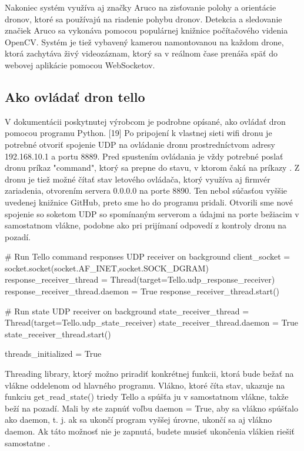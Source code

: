 Nakoniec systém využíva aj značky Aruco na zisťovanie polohy a orientácie dronov, ktoré sa používajú na riadenie pohybu dronov. Detekcia a sledovanie značiek Aruco sa vykonáva pomocou populárnej knižnice počítačového videnia OpenCV. Systém je tiež vybavený kamerou namontovanou na každom drone, ktorá zachytáva živý videozáznam, ktorý sa v reálnom čase prenáša späť do webovej aplikácie pomocou WebSocketov.
\subsection{Ako ovládať dron tello}
V dokumentácii poskytnutej výrobcom je podrobne opísané, ako ovládať dron pomocou programu Python. [19] Po pripojení k vlastnej sieti wifi dronu je potrebné otvoriť spojenie UDP na ovládanie dronu prostredníctvom adresy 192.168.10.1 a portu 8889. Pred spustením ovládania je vždy potrebné poslať dronu príkaz "command", ktorý sa prepne do stavu, v ktorom čaká na príkazy \citep{TelloSDK}. 
Z dronu je tiež možné čítať stav letového ovládača, ktorý využíva aj firmvér zariadenia, otvorením servera 0.0.0.0 na porte 8890. Ten nebol súčasťou vyššie uvedenej knižnice GitHub, preto sme ho do programu pridali. Otvorili sme nové spojenie so soketom UDP so spomínaným serverom a údajmi na porte bežiacim v samostatnom vlákne, podobne ako pri prijímaní odpovedí z kontroly dronu na pozadí. 

\begin{mypython}[caption={ukazuje obsluhu vlákna obsiahnutú v jazyku Python },label=SO-test]
    # Run Tello command responses UDP receiver on background
    client_socket = socket.socket(socket.AF_INET,socket.SOCK_DGRAM)
    response_receiver_thread = Thread(target=Tello.udp_response_receiver)
    response_receiver_thread.daemon = True
    response_receiver_thread.start()

    # Run state UDP receiver on background
    state_receiver_thread = Thread(target=Tello.udp_state_receiver)
    state_receiver_thread.daemon = True
    state_receiver_thread.start()

    threads_initialized = True
\end{mypython} 

  

Threading library, ktorý možno priradiť konkrétnej funkcii, 
ktorá bude bežať na vlákne oddelenom od hlavného programu. 
Vlákno, ktoré číta stav, ukazuje na funkciu get$_-$read$_-$state()
triedy Tello a spúšťa ju v samostatnom vlákne, takže beží na pozadí. Mali by ste zapnúť voľbu daemon = True, aby sa 
vlákno spúšťalo ako daemon, t. j. ak sa ukončí program vyššej úrovne, ukončí sa aj vlákno daemon. Ak táto možnosť nie 
je zapnutá, budete musieť ukončenia vlákien riešiť samostatne \citep{TelloSDK}.

